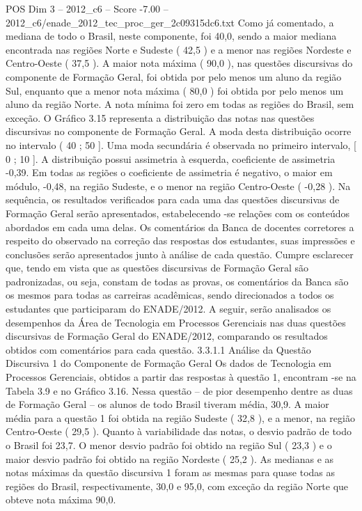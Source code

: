 \begin{textsample}{POS Dim 3 – 2012\_c6 – Score -7.00 – 2012\_c6/enade\_2012\_tec\_proc\_ger\_2c09315dc6.txt}
Como já comentado, a mediana de todo o Brasil, neste componente, foi 40,0, sendo a maior mediana encontrada nas regiões Norte e Sudeste ( 42,5 ) e a menor nas regiões Nordeste e Centro-Oeste ( 37,5 ).
A maior nota máxima ( 90,0 ), nas questões discursivas do componente de Formação Geral, foi obtida por pelo menos um aluno da região Sul, enquanto que a menor nota máxima ( 80,0 ) foi obtida por pelo menos um aluno da região Norte.
A nota mínima foi zero em todas as regiões do Brasil, sem exceção.
O Gráfico 3.15 representa a distribuição das notas nas questões discursivas no componente de Formação Geral.
A moda desta distribuição ocorre no intervalo ( 40 ; 50 ].
Uma moda secundária é observada no primeiro intervalo, [ 0 ; 10 ].
A distribuição possui assimetria à esquerda, coeficiente de assimetria -0,39.
Em todas as regiões o coeficiente de assimetria é negativo, o maior em módulo, -0,48, na região Sudeste, e o menor na região Centro-Oeste ( -0,28 ).
Na sequência, os resultados verificados para cada uma das questões discursivas de Formação Geral serão apresentados, estabelecendo -se relações com os conteúdos abordados em cada uma delas.
Os comentários da Banca de docentes corretores a respeito do observado na correção das respostas dos estudantes, suas impressões e conclusões serão apresentados junto à análise de cada questão.
Cumpre esclarecer que, tendo em vista que as questões discursivas de Formação Geral são padronizadas, ou seja, constam de todas as provas, os comentários da Banca são os mesmos para todas as carreiras acadêmicas, sendo direcionados a todos os estudantes que participaram do ENADE/2012.
A seguir, serão analisados os desempenhos da Área de Tecnologia em Processos Gerenciais nas duas questões discursivas de Formação Geral do ENADE/2012, comparando os resultados obtidos com comentários para cada questão. 3.3.1.1 Análise da Questão Discursiva 1 do Componente de Formação Geral Os dados de Tecnologia em Processos Gerenciais, obtidos a partir das respostas à questão 1, encontram -se na Tabela 3.9 e no Gráfico 3.16.
Nessa questão – de pior desempenho dentre as duas de Formação Geral – os alunos de todo Brasil tiveram média, 30,9.
A maior média para a questão 1 foi obtida na região Sudeste ( 32,8 ), e a menor, na região Centro-Oeste ( 29,5 ).
Quanto à variabilidade das notas, o desvio padrão de todo o Brasil foi 23,7.
O menor desvio padrão foi obtido na região Sul ( 23,3 ) e o maior desvio padrão foi obtido na região Nordeste ( 25,2 ).
As medianas e as notas máximas da questão discursiva 1 foram as mesmas para quase todas as regiões do Brasil, respectivamente, 30,0 e 95,0, com exceção da região Norte que obteve nota máxima 90,0.

\end{textsample}
